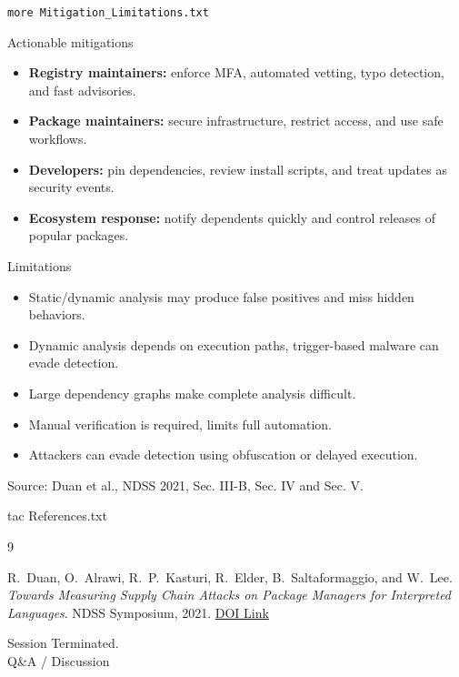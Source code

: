 \documentclass[10pt, aspectratio=169]{beamer}
\begin{document}
\begin{frame}{\texttt{more Mitigation\_Limitations.txt}}

\small
\begin{block}{Actionable mitigations}
\begin{itemize}
    \item \textbf{Registry maintainers:} enforce MFA, automated vetting, typo detection, and fast advisories.
    \item \textbf{Package maintainers:} secure infrastructure, restrict access, and use safe workflows.
    \item \textbf{Developers:} pin dependencies, review install scripts, and treat updates as security events.
    \item \textbf{Ecosystem response:} notify dependents quickly and control releases of popular packages.
\end{itemize}
\end{block}

\begin{block}{Limitations}
\begin{itemize}
    \item Static/dynamic analysis may produce false positives and miss hidden behaviors.
    \item Dynamic analysis depends on execution paths, trigger-based malware can evade detection.
    \item Large dependency graphs make complete analysis difficult.
    \item Manual verification is required, limits full automation.
    \item Attackers can evade detection using obfuscation or delayed execution.
\end{itemize}
\end{block}

\vspace{-0.5em}
{\scriptsize Source: Duan et al.\cite{duan2021}, NDSS 2021, Sec. III-B, Sec. IV and Sec. V.}

\end{frame}

\begin{frame}{tac References.txt}
\footnotesize

\begin{thebibliography}{9}

R.~Duan, O.~Alrawi, R.~P.~Kasturi, R.~Elder, B.~Saltaformaggio, and W.~Lee.\\
\textit{Towards Measuring Supply Chain Attacks on Package Managers for Interpreted Languages}.
NDSS Symposium, 2021.
\href{https://dx.doi.org/10.14722/ndss.2021.23055}{DOI Link}

\end{thebibliography}

\end{frame}

\begin{frame}[standout]
    Session Terminated. \\ \vspace{0.5em}
    \normalsize Q\&A / Discussion
\end{frame}
\end{document}
